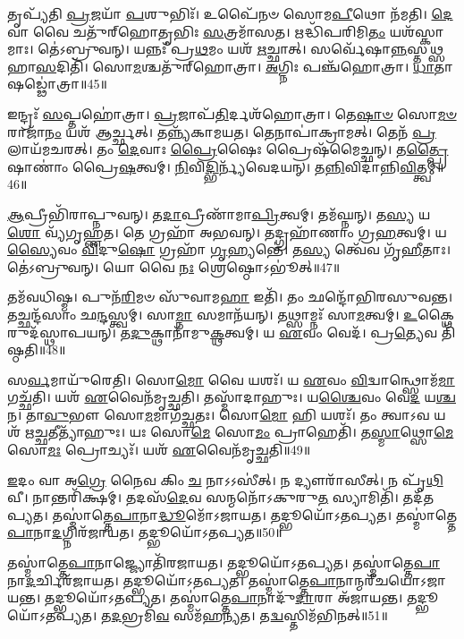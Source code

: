 𑌤𑍃𑌪𑍍𑌯᳴𑌤𑌿 \ul{𑌪𑍍𑌰}\-𑌜𑌯𑌾᳴ \ul{𑌪}\-𑌶𑍁𑌭𑌿𑌃᳴।
𑌉𑌪𑍈᳴𑌨𑍞 𑌸𑍋𑌮\-\ul{𑌪𑍀}\-𑌥𑍋 𑌨᳴𑌮𑌤𑌿।
\-\ul{𑌦𑍇}\-𑌵𑌾 𑌵𑍈 𑌚𑌤𑍁᳴𑌰𑍍‌\mbox{}𑌹𑍋𑌤𑍃𑌭𑌿𑌃 \ul{𑌸}\-𑌤𑍍𑌰𑌮𑌾᳴𑌸𑌤।
𑌋𑌦𑍍𑌧𑌿᳴𑌪𑌰𑌿𑌮𑌿\-\ul{𑌤𑌂} 𑌯𑌶᳴𑌸𑍍𑌕𑌾𑌮𑌾𑌃।
𑌤𑍇॑𑌽𑌬𑍍𑌰𑍁𑌵𑌨𑍍।
𑌯𑌨𑍍𑌨𑌃᳴ 𑌪𑍍𑌰\-\ul{𑌥}\-𑌮𑌂 𑌯𑌶᳴ \ul{𑌋}\-𑌚𑍍𑌛𑌾𑌤𑍍।
𑌸𑌰𑍍𑌵𑍇᳴𑌷𑌾\-\ul{𑌨𑍍𑌨}\-𑌸𑍍𑌤\-\ul{𑌥𑍍𑌸}\-𑌹𑌾\-\ul{𑌸}\-𑌦𑌿𑌤𑌿᳴।
𑌸𑍋\-\ul{𑌮}\-𑌶𑍍𑌚𑌤𑍁᳴𑌰𑍍‌\mbox{}𑌹𑍋𑌤𑍍𑌰𑌾।
\-\ul{𑌅}\-𑌗𑍍𑌨𑌿𑌃 𑌪𑌞𑍍𑌚᳴𑌹𑍋𑌤𑍍𑌰𑌾।
\-\ul{𑌧𑌾}\-𑌤𑌾 𑌷𑌡𑍍𑌢𑍋॑𑌤𑍍𑌰𑌾॥45॥

𑌇𑌨𑍍𑌦𑍍𑌰𑌃᳴ \ul{𑌸}\-𑌪𑍍𑌤𑌹𑍋॑𑌤𑍍𑌰𑌾।
\-\ul{𑌪𑍍𑌰}\-𑌜𑌾𑌪᳴\-\ul{𑌤𑌿}\-𑌰𑍍𑌦𑌶᳴𑌹𑍋𑌤𑍍𑌰𑌾।
𑌤𑍇\-\ul{𑌷𑌾}\-\-\ul{𑍞} 𑌸𑍋\-\ul{𑌮}\-\-\ul{𑍞} 𑌰𑌾𑌜𑌾᳴\-\ul{𑌨𑌂} 𑌯𑌶᳴ 𑌆𑌰𑍍𑌚𑍍𑌛𑌤𑍍।
𑌤𑌨𑍍𑌨𑍍𑌯᳴𑌕𑌾𑌮𑌯𑌤।
𑌤𑍇𑌨𑌾𑌪𑌾॑𑌕𑍍𑌰𑌾𑌮𑌤𑍍।
𑌤𑍇𑌨᳴ \ul{𑌪𑍍𑌰}\-𑌲𑌾𑌯᳴𑌮𑌚𑌰𑌤𑍍।
𑌤𑌂 \ul{𑌦𑍇}\-𑌵𑌾𑌃 \ul{𑌪𑍍𑌰𑍈}\-𑌷𑍈𑌃 𑌪𑍍𑌰𑍈𑌷᳴𑌮𑍈𑌚𑍍𑌛𑌨𑍍।
𑌤\-\ul{𑌤𑍍𑌪𑍍𑌰𑍈}\-𑌷𑌾𑌣𑌾𑌂॑ 𑌪𑍍𑌰𑍈\-\ul{𑌷}\-𑌤𑍍𑌵𑌮𑍍।
\-\ul{𑌨𑌿}\-𑌵𑌿\-\ul{𑌦𑍍𑌭𑌿}\-𑌰𑍍𑌨𑍍𑌯᳴𑌵𑍇𑌦𑌯𑌨𑍍।
𑌤\-\ul{𑌨𑍍𑌨𑌿}\-𑌵𑌿𑌦𑌾॑𑌨𑍍𑌨𑌿\-\ul{𑌵𑌿}\-𑌤𑍍𑌤𑍍𑌵𑌮𑍍॥46॥

\-\ul{𑌆}\-𑌪𑍍𑌰𑍀𑌭𑌿᳴𑌰𑌾𑌪𑍍𑌨𑍁𑌵𑌨𑍍।
𑌤\-\ul{𑌦𑌾}\-𑌪𑍍𑌰𑍀𑌣𑌾᳴𑌮𑌾\-\ul{𑌪𑍍𑌰𑌿}\-𑌤𑍍𑌵𑌮𑍍।
𑌤𑌮᳴𑌘𑍍𑌨𑌨𑍍।
𑌤\-\ul{𑌸𑍍𑌯} 𑌯\-\ul{𑌶𑍋} 𑌵𑍍𑌯᳴𑌗𑍃𑌹𑍍𑌣𑌤।
𑌤𑍇 𑌗𑍍𑌰𑌹𑌾᳴ 𑌅𑌭𑌵𑌨𑍍।
𑌤𑌦𑍍𑌗𑍍𑌰𑌹𑌾᳴𑌣𑌾𑌂 𑌗𑍍𑌰\-\ul{𑌹}\-𑌤𑍍𑌵𑌮𑍍।
𑌯\-\ul{𑌸𑍍𑌯𑍈}\-𑌵𑌂 \ul{𑌵𑌿}\-𑌦𑍁\-\ul{𑌷𑍋} 𑌗𑍍𑌰𑌹𑌾᳴ \ul{𑌗𑍃}\-𑌹𑍍𑌯𑌨𑍍𑌤𑍇॑।
𑌤\-\ul{𑌸𑍍𑌯} 𑌤𑍍𑌵𑍇᳴𑌵 𑌗𑍃᳴\-\ul{𑌹𑍀}\-𑌤𑌾𑌃।
𑌤𑍇॑𑌽𑌬𑍍𑌰𑍁𑌵𑌨𑍍।
𑌯𑍋 𑌵𑍈 \ul{𑌨𑌃} 𑌶𑍍𑌰𑍇𑌷𑍍𑌠𑍋\-𑌽𑌭𑍂॑𑌤𑍍॥47॥

𑌤𑌮᳴𑌵𑌧𑌿𑌷𑍍𑌮।
𑌪𑍁𑌨᳴\-\ul{𑌰𑌿}\-𑌮𑍞 𑌸𑍁᳴𑌵𑌾𑌮\-\ul{𑌹𑌾} 𑌇𑌤𑌿᳴।
𑌤𑌂 𑌛𑌨𑍍𑌦𑍋᳴𑌭𑌿𑌰𑌸𑍁𑌵𑌨𑍍𑌤।
𑌤𑌚𑍍𑌛𑌨𑍍𑌦᳴𑌸𑌾𑌂 𑌛\-\ul{𑌨𑍍𑌦}\-𑌸𑍍𑌤𑍍𑌵𑌮𑍍।
𑌸𑌾\-\ul{𑌮𑍍𑌨𑌾} 𑌸𑌮𑌾𑌨᳴𑌯𑌨𑍍।
𑌤𑌥𑍍𑌸𑌾𑌮𑍍𑌨𑌃᳴ 𑌸𑌾\-\ul{𑌮}\-𑌤𑍍𑌵𑌮𑍍।
\-\ul{𑌉}\-𑌕𑍍𑌥𑍈𑌰𑍁𑌦᳴𑌸𑍍𑌥𑌾𑌪𑌯𑌨𑍍।
𑌤\-\ul{𑌦𑍁}\-𑌕𑍍𑌥𑌾𑌨𑌾᳴𑌮𑍁\-\ul{𑌕𑍍𑌥}\-𑌤𑍍𑌵𑌮𑍍।
𑌯 \ul{𑌏}\-𑌵𑌂 𑌵𑍇𑌦᳴।
𑌪𑍍𑌰\-\ul{𑌤𑍍𑌯𑍇}\-𑌵 𑌤𑌿᳴𑌷𑍍𑌠𑌤𑌿॥48॥

𑌸\-\ul{𑌰𑍍𑌵}\-𑌮𑌾𑌯𑍁᳴𑌰𑍇𑌤𑌿।
𑌸𑍋\-\ul{𑌮𑍋} 𑌵𑍈 𑌯𑌶𑌃᳴।
𑌯 \ul{𑌏}\-𑌵𑌂 \ul{𑌵𑌿}\-𑌦𑍍𑌵𑌾𑌨𑍍𑌥𑍍𑌸𑍋𑌮᳴\-\ul{𑌮𑌾}\-𑌗𑌚𑍍𑌛᳴𑌤𑌿।
𑌯𑌶᳴ \ul{𑌏}\-𑌵𑍈𑌨᳴𑌮𑍃𑌚𑍍𑌛𑌤𑌿।
𑌤𑌸𑍍𑌮𑌾᳴𑌦𑌾𑌹𑍁𑌃।
𑌯\-\ul{𑌶𑍍𑌚𑍈}\-𑌵𑌂 𑌵𑍇\-\ul{𑌦} 𑌯\-\ul{𑌶𑍍𑌚} 𑌨।
𑌤𑌾\-\ul{𑌵𑍁}\-𑌭𑍗 𑌸𑍋\-\ul{𑌮}\-𑌮𑌾𑌗᳴𑌚𑍍𑌛𑌤𑌃।
𑌸𑍋\-\ul{𑌮𑍋} 𑌹𑌿 𑌯𑌶𑌃᳴।
𑌤𑌂 𑌤𑍍𑌵𑌾𑌽𑌵 𑌯𑌶᳴ 𑌋\-\ul{𑌚𑍍𑌛}\-𑌤𑍀𑌤𑍍𑌯𑌾᳴𑌹𑍁𑌃।
𑌯𑌃 𑌸𑍋\-\ul{𑌮𑍇} 𑌸𑍋\-\ul{𑌮𑌂} 𑌪𑍍𑌰𑌾𑌹𑍇𑌤𑌿᳴।
𑌤\-\ul{𑌸𑍍𑌮𑌾}\-𑌥𑍍𑌸𑍋\-\ul{𑌮𑍇} 𑌸𑍋\-\ul{𑌮𑌃} 𑌪𑍍𑌰𑍋𑌚𑍍𑌯𑌃᳴।
𑌯𑌶᳴ \ul{𑌏}\-𑌵𑍈𑌨᳴𑌮𑍃𑌚𑍍𑌛𑌤𑌿॥49॥\anuvakamend[\-\ul{𑌅}\-\-\ul{𑌭𑌿}\-\-\ul{𑌷𑍁}\-𑌣𑍍𑌵𑌨𑍍𑌤𑌿᳴ \ul{𑌸}\-𑌪𑍍𑌤𑌹𑍋᳴𑌤𑌾 𑌤𑌰𑍍𑌪𑌯\-\ul{𑌤𑌿} 𑌷𑌡𑍍𑌢𑍋॑𑌤𑍍𑌰𑌾 𑌨𑌿\-\ul{𑌵𑌿}\-𑌤𑍍𑌤𑍍𑌵𑌮𑌭𑍂॑𑌤𑍍𑌤𑌿𑌷𑍍𑌠\-\ul{𑌤𑌿} 𑌪𑍍𑌰𑌾𑌹𑍇\-\ul{𑌤𑌿} 𑌦𑍍𑌵𑍇 𑌚᳴]

\-\ul{𑌇}\-𑌦𑌂 𑌵𑌾 𑌅\-\ul{𑌗𑍍𑌰𑍇} 𑌨𑍈𑌵 𑌕𑌿𑌂 \ul{𑌚} 𑌨𑌾𑌽𑌽𑌸𑍀॑𑌤𑍍।
𑌨 𑌦𑍍𑌯𑍗𑌰𑌾᳴𑌸𑍀𑌤𑍍।
𑌨 𑌪𑍃᳴\-\ul{𑌥𑌿}\-𑌵𑍀।
𑌨𑌾𑌨𑍍𑌤𑌰𑌿᳴𑌕𑍍𑌷𑌮𑍍।
𑌤𑌦𑌸᳴\-\ul{𑌦𑍇}\-𑌵 𑌸𑌨𑍍𑌮𑌨𑍋᳴\-𑌽𑌕𑍁𑌰𑍁\-\ul{𑌤} 𑌸𑍍𑌯𑌾𑌮𑌿𑌤𑌿᳴।
𑌤𑌦᳴𑌤𑌪𑍍𑌯𑌤।
𑌤𑌸𑍍𑌮𑌾॑𑌤𑍍𑌤𑍇\-\ul{𑌪𑌾}\-𑌨𑌾\-\ul{𑌦𑍍𑌧𑍂}\-𑌮𑍋᳴\-𑌽𑌜𑌾𑌯𑌤।
𑌤𑌦𑍍𑌭𑍂𑌯𑍋᳴\-𑌽𑌤𑌪𑍍𑌯𑌤।
𑌤𑌸𑍍𑌮𑌾॑𑌤𑍍𑌤𑍇\-\ul{𑌪𑌾}\-𑌨𑌾\-\ul{𑌦}\-𑌗𑍍𑌨𑌿𑌰᳴𑌜𑌾𑌯𑌤।
𑌤𑌦𑍍𑌭𑍂𑌯𑍋᳴\-𑌽𑌤𑌪𑍍𑌯𑌤॥50॥

𑌤𑌸𑍍𑌮𑌾॑𑌤𑍍𑌤𑍇\-\ul{𑌪𑌾}\-𑌨𑌾𑌜𑍍𑌜𑍍𑌯𑍋𑌤𑌿᳴𑌰𑌜𑌾𑌯𑌤।
𑌤𑌦𑍍𑌭𑍂𑌯𑍋᳴\-𑌽𑌤𑌪𑍍𑌯𑌤।
𑌤𑌸𑍍𑌮𑌾॑𑌤𑍍𑌤𑍇\-\ul{𑌪𑌾}\-𑌨𑌾\-\-\ul{𑌦}\-𑌰𑍍𑌚𑌿𑌰᳴𑌜𑌾𑌯𑌤।
𑌤𑌦𑍍𑌭𑍂𑌯𑍋᳴\-𑌽𑌤𑌪𑍍𑌯𑌤।
𑌤𑌸𑍍𑌮𑌾॑𑌤𑍍𑌤𑍇\-\ul{𑌪𑌾}\-𑌨𑌾𑌨𑍍𑌮𑌰𑍀᳴𑌚𑌯𑍋\-𑌽𑌜𑌾𑌯𑌨𑍍𑌤।
𑌤𑌦𑍍𑌭𑍂𑌯𑍋᳴\-𑌽𑌤𑌪𑍍𑌯𑌤।
𑌤𑌸𑍍𑌮𑌾॑𑌤𑍍𑌤𑍇\-\ul{𑌪𑌾}\-𑌨𑌾𑌦𑍁᳴\-\ul{𑌦𑌾}\-𑌰𑌾 𑌅᳴𑌜𑌾𑌯𑌨𑍍𑌤।
𑌤𑌦𑍍𑌭𑍂𑌯𑍋᳴\-𑌽𑌤𑌪𑍍𑌯𑌤।
𑌤\-\ul{𑌦}\-𑌭𑍍𑌰𑌮𑌿᳴\-\ul{𑌵} 𑌸𑌮᳴𑌹𑌨𑍍𑌯𑌤।
𑌤\-\ul{𑌦𑍍𑌵}\-𑌸𑍍𑌤𑌿𑌮᳴𑌭𑌿𑌨𑌤𑍍॥51॥

